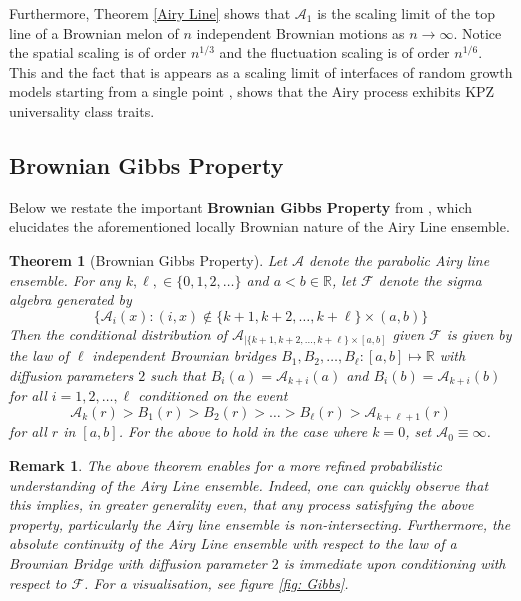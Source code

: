 \documentclass[12pt]{report}
\theoremstyle{plain}
\newtheorem{theorem}{Theorem}[section]
\newtheorem*{remark}{Remark}
\begin{document}
Furthermore, Theorem \ref{Airy Line} shows that \(\mathbf{\mathcal{A}}_1\) is the scaling limit of the top line of a Brownian melon of \(n\) independent Brownian motions as \(n\to \infty\). Notice the spatial scaling is of order \(n^{1/3}\) and the fluctuation scaling is of order \(n^{1/6}\). This and the fact that is appears as a scaling limit of interfaces of random growth models starting from a single point \cite{sarkar2021brownian}, shows that the Airy process exhibits KPZ universality class traits.

\subsection{Brownian Gibbs Property}

\indent Below we restate the important \textbf{Brownian Gibbs Property} from \cite{sarkar2021brownian}, which elucidates the aforementioned locally Brownian nature of the Airy Line ensemble. 

\begin{theorem}[Brownian Gibbs Property]\label{thm: Brownian Gibbs}
Let \(\mathcal{A}\) denote the parabolic Airy line ensemble. For any \(k, \ell, \in\{0,1,2,\dots\}\) and \(a<b\in\mathbb{R}\), let \(\mathcal{F}\) denote the sigma algebra generated by 
\[\{\mathcal{A}_{i}(x):(i,x)\notin \{k+1, k+2, \dots, k+\ell\}\times (a,b)\}\]
Then the conditional distribution of \(\mathcal{A}_{|\{k+1, k+2, \dots, k+\ell\}\times [a,b]}\) given \(\mathcal{F}\) is given by the law of \(\ell\) independent Brownian bridges \(B_1, B_2, \dots, B_{\ell}:[a,b]\mapsto \mathbb{R}\) with diffusion parameters \(2\) such that \(B_{i}(a) = \mathcal{A}_{k+i}(a)\) and \(B_{i}(b) = \mathcal{A}_{k+i}(b)\) for all \(i = 1,2,\dots, \ell\) conditioned on the event
\[\mathcal{A}_k(r)>B_1(r)>B_2(r)>\dots >B_\ell(r)>\mathcal{A}_{k+\ell+1}(r)\]
for all \(r\) in \([a,b]\). For the above to hold in the case where \(k=0\), set \(\mathcal{A}_0\equiv \infty\).
\end{theorem}%

\begin{remark}
    The above theorem enables for a more refined probabilistic understanding of the Airy Line ensemble. Indeed, one can quickly observe that this implies, in greater generality even, that any process satisfying the above property, particularly the Airy line ensemble is non-intersecting. Furthermore, the absolute continuity of the Airy Line ensemble with respect to the law of a Brownian Bridge with diffusion parameter \(2\) is immediate upon conditioning with respect to \(\mathcal{F}\). For a visualisation, see figure \ref{fig: Gibbs}.
\end{remark}
\end{document}
